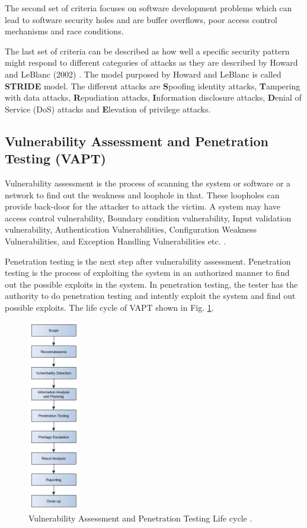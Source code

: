 \documentclass[pdftex,english,oribibl]{llncs}
\begin{document}
The second set of criteria focuses on software development problems which can lead to software security holes and are buffer overflows, poor access control mechanisms and race conditions.

The last set of criteria can be described as how well a specific security pattern might respond to different categories of attacks as they are described by Howard and LeBlanc (2002) \cite{Howard:2002:WSC:579079}. The model purposed by Howard and LeBlanc is called \textbf{STRIDE} model. The different attacks are \textbf{S}poofing identity attacks, \textbf{T}ampering with data attacks, \textbf{R}epudiation attacks, \textbf{I}nformation disclosure attacks, \textbf{D}enial of Service (DoS) attacks and \textbf{E}levation of privilege attacks.


\subsection{Vulnerability Assessment and Penetration Testing (VAPT)}
Vulnerability assessment is the process of scanning the system or software or a network to find out the weakness and loophole in that. These loopholes can provide back-door for the  attacker to attack the victim. A system may have access control vulnerability, Boundary condition vulnerability, Input validation vulnerability, Authentication Vulnerabilities, Configuration Weakness Vulnerabilities, and Exception Handling Vulnerabilities etc. \cite{GOEL2015710}.

Penetration testing is the next step after vulnerability assessment. Penetration testing is the process of exploiting the system in an authorized manner to find out the possible exploits in the system. In penetration testing, the tester has the authority to do penetration testing and intently exploit the system and find out possible exploits. The life cycle of VAPT shown in Fig. \ref{fig:vapt_lifecycle}.

\begin{figure}[h]
	\centering\includegraphics[width=0.2\textwidth]{figures/vapt_lifecycle.png}
	\caption{Vulnerability Assessment and Penetration Testing Life cycle \cite{GOEL2015710}.}
	\label{fig:vapt_lifecycle}
\end{figure}
\end{document}
